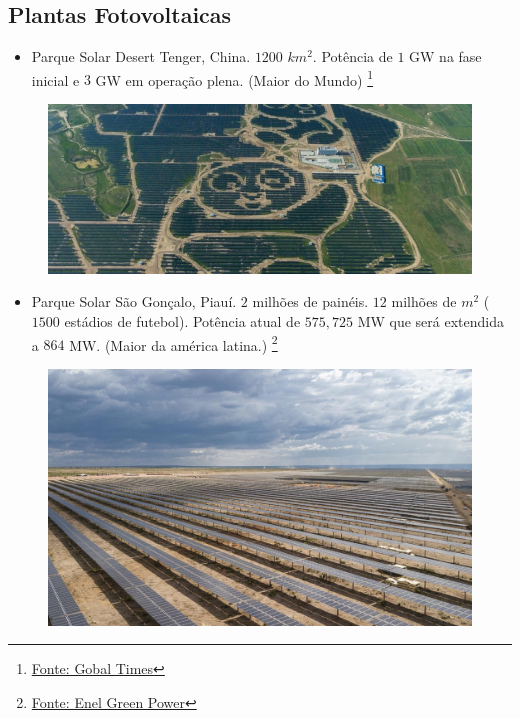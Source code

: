 \documentclass[12pt,notheorems,hyperref={pdfauthor=Professor Rafael Nardi}]{beamer}
\begin{document}
\subsection{Plantas Fotovoltaicas}

\begin{frame}%

	\begin{itemize}
		\item Parque Solar Desert Tenger, China. $1200$ $km^2$. Potência de $1$ GW na fase inicial e $3$
			GW em operação plena. (Maior do Mundo) \footnote{ \href{https://www.globaltimes.cn/page/202209/1275050.shtml}{Fonte: Gobal Times}}
	\end{itemize}

	\begin{figure}
		\centering
		\includegraphics[scale=0.45]{./92336_parquesolardeserttenger.jpg}
	\end{figure}

\end{frame}

\begin{frame}%

	\begin{itemize}
		\item Parque Solar São Gonçalo, Piauí. $2$ milhões de painéis. $12$ milhões de
	$m^2$ ($1500$ estádios de futebol). Potência atual de $575,725$ MW que será
	extendida a $864$ MW. (Maior da américa latina.) \footnote{ \href{https://www.enelgreenpower.com/pt/nossos-projetos/highlights/parque-solar-sao-goncalo}{Fonte: Enel Green Power}}
	\end{itemize}

	\begin{figure}
		\centering
		\includegraphics[scale=0.38]{./parco-solare-sao-goncalo_1584x960.jpg}
	\end{figure}

\end{frame}
\end{document}
